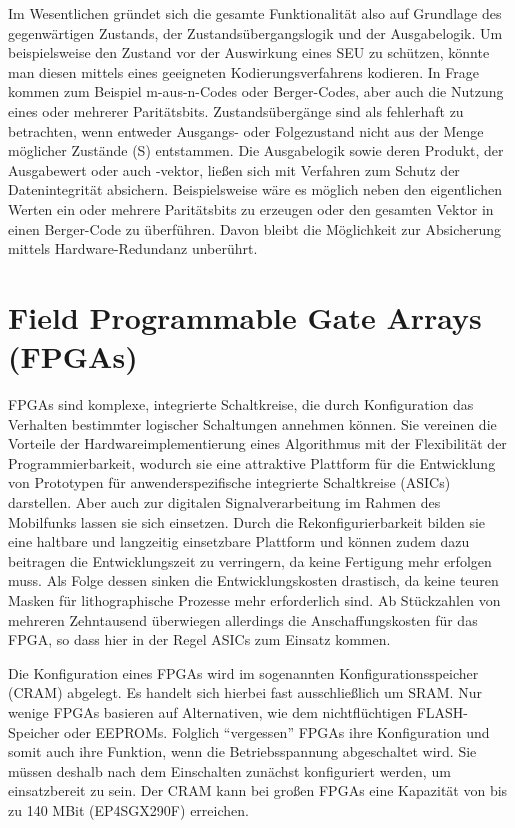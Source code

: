 Im Wesentlichen gründet sich die gesamte Funktionalität also auf
Grundlage des gegenwärtigen Zustands, der Zustandsübergangslogik und
der Ausgabelogik. Um beispielsweise den Zustand vor der Auswirkung
eines SEU zu schützen, könnte man diesen mittels eines geeigneten
Kodierungsverfahrens kodieren. In Frage kommen zum Beispiel
m-aus-n-Codes oder Berger-Codes, aber auch die Nutzung eines oder
mehrerer Paritätsbits. Zustandsübergänge sind als fehlerhaft zu
betrachten, wenn entweder Ausgangs- oder Folgezustand nicht aus der
Menge möglicher Zustände (S) entstammen. Die Ausgabelogik sowie deren
Produkt, der Ausgabewert oder auch -vektor, ließen sich mit Verfahren
zum Schutz der Datenintegrität absichern. Beispielsweise wäre es
möglich neben den eigentlichen Werten ein oder mehrere Paritätsbits zu
erzeugen oder den gesamten Vektor in einen Berger-Code zu überführen.
Davon bleibt die Möglichkeit zur Absicherung mittels
Hardware-Redundanz unberührt.

\section{Field Programmable Gate Arrays (FPGAs)}
\label{sec:grundlagen_fpgas}
FPGAs sind komplexe, integrierte Schaltkreise, die durch Konfiguration
das Verhalten bestimmter logischer Schaltungen annehmen können. Sie
vereinen die Vorteile der Hardwareimplementierung eines Algorithmus
mit der Flexibilität der Programmierbarkeit, wodurch sie eine
attraktive Plattform für die Entwicklung von Prototypen für
anwenderspezifische integrierte Schaltkreise (ASICs) darstellen. Aber
auch zur digitalen Signalverarbeitung im Rahmen des Mobilfunks lassen
sie sich einsetzen. Durch die Rekonfigurierbarkeit bilden sie eine
haltbare und langzeitig einsetzbare Plattform und können zudem dazu
beitragen die Entwicklungszeit zu verringern, da keine Fertigung mehr
erfolgen muss. Als Folge dessen sinken die Entwicklungskosten
drastisch, da keine teuren Masken für lithographische Prozesse mehr
erforderlich sind. Ab Stückzahlen von mehreren Zehntausend überwiegen
allerdings die Anschaffungskosten für das FPGA, so dass hier in der
Regel ASICs zum Einsatz kommen.

Die Konfiguration eines FPGAs wird im sogenannten
Konfigurationsspeicher (C\-RAM) abgelegt. Es handelt sich hierbei fast
ausschließlich um SRAM. Nur wenige FPGAs basieren auf Alternativen,
wie dem nichtflüchtigen FLASH-Speicher oder EE\-PROMs. Folglich
``vergessen'' FPGAs ihre Konfiguration und somit auch ihre Funktion,
wenn die Betriebsspannung abgeschaltet wird. Sie müssen deshalb nach
dem Einschalten zunächst konfiguriert werden, um einsatzbereit zu
sein. Der CRAM kann bei großen FPGAs eine Kapazität von bis zu 140
MBit (EP4SGX290F) \cite{stratixfamily09} erreichen.

